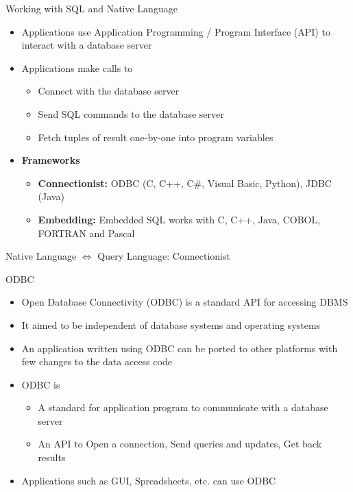 \documentclass[aspectratio=169, xcolor=dvipsnames]{beamer}
\begin{document}
\begin{frame}{Working with SQL and Native Language}
    \begin{itemize}[<+->]
        \item Applications use Application Programming / Program Interface (API) to interact with a database server
        \item Applications make calls to
        \begin{itemize}
            \item[$\triangleright$] Connect with the database server
            \item[$\triangleright$] Send SQL commands to the database server
            \item[$\triangleright$] Fetch tuples of result one-by-one into program variables
        \end{itemize}
        \item \textbf{Frameworks}
        \begin{itemize}
            \item[$\triangleright$] \textbf{Connectionist:} ODBC (C, C++, C\#, Visual Basic, Python), JDBC (Java)
            \item[$\triangleright$] \textbf{Embedding:} Embedded SQL works with C, C++, Java, COBOL, FORTRAN and Pascal
        \end{itemize}
    \end{itemize}
\end{frame}

\begin{frame}{Native Language $\Leftrightarrow$ Query Language: Connectionist}
    \begin{center}
    \end{center}
\end{frame}

\begin{frame}{ODBC}
    \begin{itemize}[<+->]
        \item Open Database Connectivity (ODBC) is a standard API for accessing DBMS
        \item It aimed to be independent of database systems and operating systems
        \item An application written using ODBC can be ported to other platforms with few changes to the data access code
        \item ODBC is
        \begin{itemize}
            \item[$\triangleright$] A standard for application program to communicate with a database server
            \item[$\triangleright$] An API to Open a connection, Send queries and updates, Get back results
        \end{itemize}
        \item Applications such as GUI, Spreadsheets, etc. can use ODBC
    \end{itemize}
\end{frame}
\end{document}
